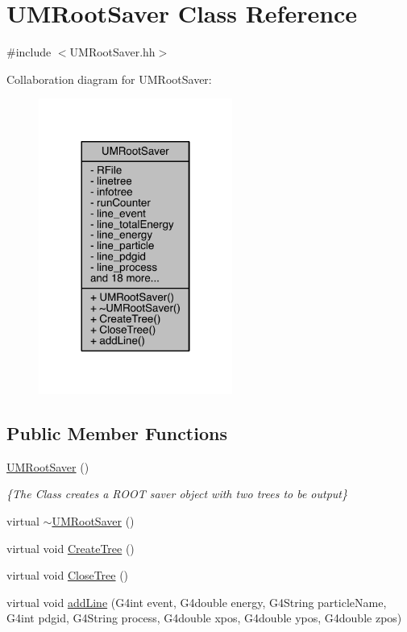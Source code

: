 \hypertarget{classUMRootSaver}{}\section{U\+M\+Root\+Saver Class Reference}
\label{classUMRootSaver}


{\ttfamily \#include $<$U\+M\+Root\+Saver.\+hh$>$}



Collaboration diagram for U\+M\+Root\+Saver\+:
\nopagebreak
\begin{figure}[H]
\begin{center}
\leavevmode
\includegraphics[width=180pt]{classUMRootSaver__coll__graph}
\end{center}
\end{figure}
\subsection*{Public Member Functions}
\begin{DoxyCompactItemize}
\item 
\hyperlink{classUMRootSaver_a96154d44d69b9dc6e0aef05a9f39e7dc}{U\+M\+Root\+Saver} ()
\begin{DoxyCompactList}\small\item\em \{The Class creates a R\+O\+O\+T saver object with two trees to be output\} \end{DoxyCompactList}\item 
virtual \hyperlink{classUMRootSaver_a874c1e2de31c7bde041e5ab6310219ca}{$\sim$\+U\+M\+Root\+Saver} ()
\item 
virtual void \hyperlink{classUMRootSaver_a12b7c7cf3bba7c57b940b7c70566331c}{Create\+Tree} ()
\item 
virtual void \hyperlink{classUMRootSaver_a04707033a436e745215d082ae70c1c3d}{Close\+Tree} ()
\item 
virtual void \hyperlink{classUMRootSaver_a0574c48b931667d328005772a49f2f4e}{add\+Line} (G4int event, G4double energy, G4\+String particle\+Name, G4int pdgid, G4\+String process, G4double xpos, G4double ypos, G4double zpos)
\end{DoxyCompactItemize}
